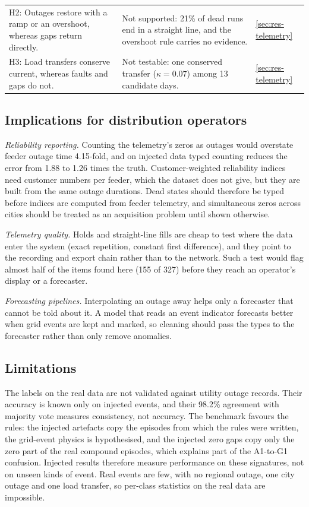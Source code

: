 \begin{table}[htbp]
\begin{tabularx}{\textwidth}{@{}L{4.2cm} Y l@{}}
H2: Outages restore with a ramp or an overshoot, whereas gaps return directly. & Not supported: 21\% of dead runs end in a straight line, and the overshoot rule carries no evidence. & \ref{sec:res-telemetry} \\
H3: Load transfers conserve current, whereas faults and gaps do not. & Not testable: one conserved transfer ($\kappa = 0.07$) among 13 candidate days. & \ref{sec:res-telemetry} \\
\bottomrule
\end{tabularx}
\end{table}

\subsection{Implications for distribution operators}\label{sec:implications}

\emph{Reliability reporting.} Counting the telemetry's zeros as outages would overstate feeder outage time 4.15-fold, and on injected data typed counting reduces the error from 1.88 to 1.26 times the truth. Customer-weighted reliability indices need customer numbers per feeder, which the dataset does not give, but they are built from the same outage durations. Dead states should therefore be typed before indices are computed from feeder telemetry, and simultaneous zeros across cities should be treated as an acquisition problem until shown otherwise.

\emph{Telemetry quality.} Holds and straight-line fills are cheap to test where the data enter the system (exact repetition, constant first difference), and they point to the recording and export chain rather than to the network. Such a test would flag almost half of the items found here (155 of 327) before they reach an operator's display or a forecaster.

\emph{Forecasting pipelines.} Interpolating an outage away helps only a forecaster that cannot be told about it. A model that reads an event indicator forecasts better when grid events are kept and marked, so cleaning should pass the types to the forecaster rather than only remove anomalies.
\subsection{Limitations}\label{sec:limitations}

The labels on the real data are not validated against utility outage records. Their accuracy is known only on injected events, and their 98.2\% agreement with majority vote measures consistency, not accuracy. The benchmark favours the rules: the injected artefacts copy the episodes from which the rules were written, the grid-event physics is hypothesised, and the injected zero gaps copy only the zero part of the real compound episodes, which explains part of the A1-to-G1 confusion. Injected results therefore measure performance on these signatures, not on unseen kinds of event. Real events are few, with no regional outage, one city outage and one load transfer, so per-class statistics on the real data are impossible.

